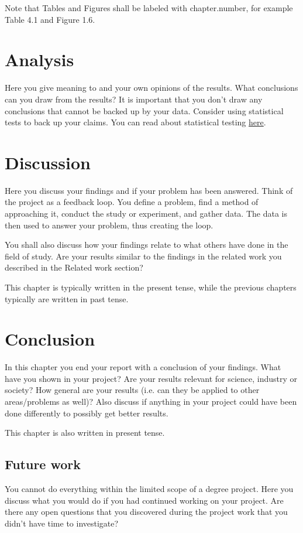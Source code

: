 \documentclass[a4paper,12pt]{article}
\begin{document}
Note that Tables and Figures shall be labeled with chapter.number, for example Table 4.1 and Figure 1.6.

\newpage
	
\section{Analysis}
Here you give meaning to and your own opinions of the results. What conclusions can you draw from the results? It is important that you don't draw any conclusions that cannot be backed up by your data. Consider using statistical tests to back up your claims. You can read about statistical testing \href{https://coursepress.lnu.se/subject/thesis-projects/statistical-testing/}{here}. 
	
\newpage
	
\section{Discussion}
Here you discuss your findings and if your problem has been answered. Think of the project as a feedback loop. You define a problem, find a method of approaching it, conduct the study or experiment, and gather data. The data is then used to answer your problem, thus creating the loop.

You shall also discuss how your findings relate to what others have done in the field of study. Are your results similar to the findings in the related work you described in the Related work section?

This chapter is typically written in the present tense, while the previous chapters typically are written in past tense.

\newpage
		
\section{Conclusion}
In this chapter you end your report with a conclusion of your findings. What have you shown in your project? Are your results relevant for science, industry or society? How general are your results (i.e. can they be applied to other areas/problems as well)? Also discuss if anything in your project could have been done differently to possibly get better results. 

This chapter is also written in present tense.

\subsection{Future work}
You cannot do everything within the limited scope of a degree project. Here you discuss what you would do if you had continued working on your project. Are there any open questions that you discovered during the project work that you didn't have time to investigate?
\end{document}

